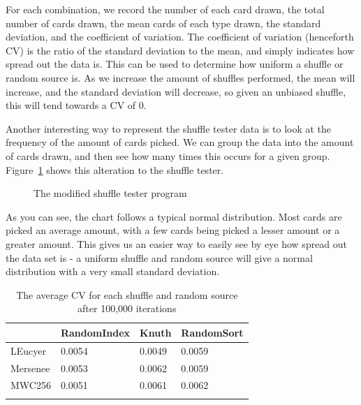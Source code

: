 For each combination, we record the number of each card drawn, the total
number of cards drawn, the mean cards of each type drawn, the standard
deviation, and the coefficient of variation. The coefficient of variation
(henceforth CV) is the ratio of the standard deviation to the mean, and
simply indicates how spread out the data is. This can be used to determine
how uniform a shuffle or random source is. As we increase the amount of
shuffles performed, the mean will increase, and the standard deviation will
decrease, so given an unbiased shuffle, this will tend towards a CV of 0.

Another interesting way to represent the shuffle tester data is to look at
the frequency of the amount of cards picked. We can group the data into
the amount of cards drawn, and then see how many times this occurs for a given
group. Figure~\ref{fig:shuffletester2} shows this alteration to the shuffle
tester.

\begin{figure}[h]
    \caption{The modified shuffle tester program}%
    \label{fig:shuffletester2}
\end{figure}

As you can see, the chart follows a typical normal distribution. Most cards are
picked an average amount, with a few cards being picked a lesser amount or
a greater amount. This gives us an easier way to easily see by eye how spread
out the data set is - a uniform shuffle and random source will give a normal
distribution with a very small standard deviation.

\begin{table}[H]
    \centering
    \begin{tabular}{l l l l}
    \toprule
                & RandomIndex   & Knuth & RandomSort  \\
    \midrule
    LEucyer     & 0.0054        & 0.0049& 0.0059      \\ \addlinespace
    Mersenee    & 0.0053        & 0.0062& 0.0059      \\ \addlinespace
    MWC256      & 0.0051        & 0.0061& 0.0062      \\ \addlinespace
    \bottomrule
    \end{tabular}
    \caption{The average CV for each shuffle and random source after 100,000
             iterations}
\end{table}

